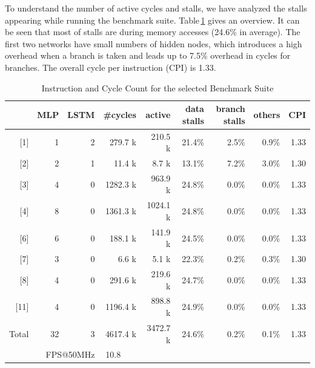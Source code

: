 To understand the number of active cycles and stalls, we have analyzed the stalls appearing while running the benchmark suite. Table\,\ref{tab:stalls} gives an overview. It can be seen that most of stalls are during memory accesses (24.6\% in average). The first two networks have small numbers of hidden nodes, which introduces a high overhead when a branch is taken and leads up to 7.5\% overhead in cycles for branches. The overall cycle per instruction (CPI) is 1.33.

\begin{table}[h]
\centering
\begin{tabular}{|r|r|r|r|r|r|r|r|r|}
\hline
          & MLP & LSTM & \#cycles & active & data stalls & branch stalls & others & CPI  \\ \hline
{[}1{]}  & 1   & 2    & 279.7 k      & 210.5 k           & 21.4\%      & 2.5\%          & 0.9\%       & 1.33 \\ \hline
{[}2{]}  & 2   & 1    & 11.4 k       & 8.7 k             & 13.1\%      & 7.2\%          & 3.0\%       & 1.30 \\ \hline
{[}3{]}  & 4   & 0    & 1282.3 k     & 963.9 k           & 24.8\%      & 0.0\%          & 0.0\%       & 1.33 \\ \hline
{[}4{]}  & 8   & 0    & 1361.3 k     & 1024.1 k          & 24.8\%      & 0.0\%          & 0.0\%       & 1.33 \\ \hline
{[}6{]}  & 6   & 0    & 188.1 k      & 141.9 k           & 24.5\%      & 0.0\%          & 0.0\%       & 1.33 \\ \hline
{[}7{]}  & 3   & 0    & 6.6 k        & 5.1 k             & 22.3\%      & 0.2\%          & 0.3\%       & 1.30 \\ \hline
{[}8{]}  & 4   & 0    & 291.6 k      & 219.6 k           & 24.7\%      & 0.0\%          & 0.0\%       & 1.33 \\ \hline
{[}11{]} & 4   & 0    & 1196.4 k     & 898.8 k           & 24.9\%      & 0.0\%          & 0.0\%       & 1.33 \\ \hline\hline
Total    & 32  & 3    & 4617.4 k     & 3472.7 k          & 24.6\%      & 0.2\%          & 0.1\%       & 1.33 \\ \hline
      \multicolumn{3}{|r|}{FPS@50MHz}       & 10.8 \ \ \       &  \multicolumn{5}{l}{}      \\ \cline{1-4}
\end{tabular}


\caption{Instruction and Cycle Count for the selected Benchmark Suite }\label{tab:stalls}
\end{table}



